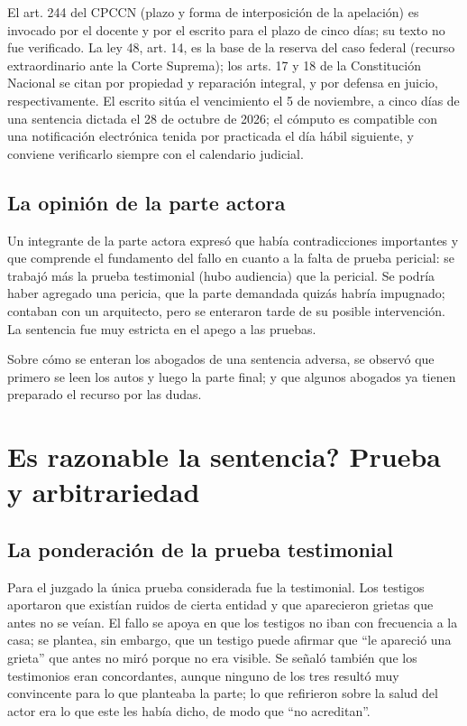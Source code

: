\documentclass[12pt,oneside]{book}
\begin{document}
\begin{note}
El art. 244 del CPCCN (plazo y forma de interposici\'on de la apelaci\'on) es invocado por el docente y por el escrito para el plazo de cinco d\'ias; su texto no fue verificado. La ley 48, art. 14, es la base de la reserva del caso federal (recurso extraordinario ante la Corte Suprema); los arts. 17 y 18 de la Constituci\'on Nacional se citan por propiedad y reparaci\'on integral, y por defensa en juicio, respectivamente. El escrito sit\'ua el vencimiento el 5 de noviembre, a cinco d\'ias de una sentencia dictada el 28 de octubre de 2026; el c\'omputo es compatible con una notificaci\'on electr\'onica tenida por practicada el d\'ia h\'abil siguiente, y conviene verificarlo siempre con el calendario judicial.
\end{note}

\subsection{La opini\'on de la parte actora}

Un integrante de la parte actora expres\'o que hab\'ia contradicciones importantes y que comprende el fundamento del fallo en cuanto a la falta de prueba pericial: se trabaj\'o m\'as la prueba testimonial (hubo audiencia) que la pericial. Se podr\'ia haber agregado una pericia, que la parte demandada quiz\'as habr\'ia impugnado; contaban con un arquitecto, pero se enteraron tarde de su posible intervenci\'on. La sentencia fue muy estricta en el apego a las pruebas.

Sobre c\'omo se enteran los abogados de una sentencia adversa, se observ\'o que primero se leen los autos y luego la parte final; y que algunos abogados ya tienen preparado el recurso por las dudas.

\section{\textquestiondown Es razonable la sentencia? Prueba y arbitrariedad}

\subsection{La ponderaci\'on de la prueba testimonial}

Para el juzgado la \'unica prueba considerada fue la testimonial. Los testigos aportaron que exist\'ian ruidos de cierta entidad y que aparecieron grietas que antes no se ve\'ian. El fallo se apoya en que los testigos no iban con frecuencia a la casa; se plantea, sin embargo, que un testigo puede afirmar que ``le apareci\'o una grieta'' que antes no mir\'o porque no era visible. Se se\~nal\'o tambi\'en que los testimonios eran concordantes, aunque ninguno de los tres result\'o muy convincente para lo que planteaba la parte; lo que refirieron sobre la salud del actor era lo que este les hab\'ia dicho, de modo que ``no acreditan''.
\end{document}
